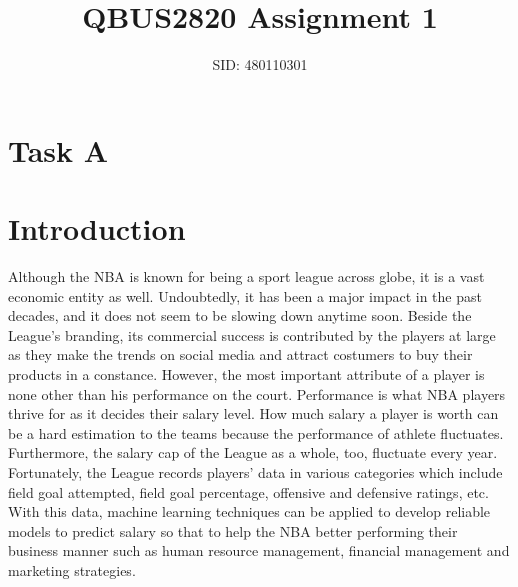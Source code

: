 \documentclass[letterpaper,12pt,twoside,]{pinp}
\title{QBUS2820 Assignment 1}
\author[a]{SID: 480110301}
\begin{document}
\verticaladjustment{-2pt}

\maketitle
\thispagestyle{firststyle}




\hypertarget{task-a}{%
\section{Task A}\label{task-a}}

\hypertarget{introduction}{%
\section{Introduction}\label{introduction}}

Although the NBA is known for being a sport league across globe, it is a
vast economic entity as well. Undoubtedly, it has been a major impact in
the past decades, and it does not seem to be slowing down anytime soon.
Beside the League's branding, its commercial success is contributed by
the players at large as they make the trends on social media and attract
costumers to buy their products in a constance. However, the most
important attribute of a player is none other than his performance on
the court. Performance is what NBA players thrive for as it decides
their salary level. How much salary a player is worth can be a hard
estimation to the teams because the performance of athlete fluctuates.
Furthermore, the salary cap of the League as a whole, too, fluctuate
every year. Fortunately, the League records players' data in various
categories which include field goal attempted, field goal percentage,
offensive and defensive ratings, etc. With this data, machine learning
techniques can be applied to develop reliable models to predict salary
so that to help the NBA better performing their business manner such as
human resource management, financial management and marketing
strategies.
\end{document}

